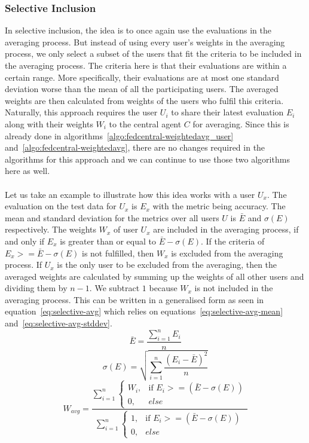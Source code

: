 \documentclass[12pt]{article}
\begin{document}
\subsubsection{Selective Inclusion}
In selective inclusion, the idea is to once again use the evaluations in the averaging process. But instead of using every user's weights in the averaging process, we only select a subset of the users that fit the criteria to be included in the averaging process. The criteria here is that their evaluations are within a certain range. More specifically, their evaluations are at most one standard deviation worse than the mean of all the participating users. The averaged weights are then calculated from weights of the users who fulfil this criteria. Naturally, this approach requires the user $U_i$ to share their latest evaluation $E_i$ along with their weights $W_i$ to the central agent $C$ for averaging. Since this is already done in algorithms~\ref{algo:fedcentral-weightedavg_user} and~\ref{algo:fedcentral-weightedavg}, there are no changes required in the algorithms for this approach and we can continue to use those two algorithms here as well.
\\\\
Let us take an example to illustrate how this idea works with a user $U_x$. The evaluation on the test data for $U_x$ is $E_x$ with the metric being accuracy. The mean and standard deviation for the metrics over all users $U$ is $\bar{E}$ and $\sigma(E)$ respectively. The weights $W_x$ of user $U_x$ are included in the averaging process, if and only if $E_x$ is greater than or equal to $\bar{E}-\sigma(E)$. If the criteria of $E_x >= \bar{E}-\sigma(E)$ is not fulfilled, then $W_x$ is excluded from the averaging process. If $U_x$ is the only user to be excluded from the averaging, then the averaged weights are calculated by summing up the weights of all other users and dividing them by $n-1$. We subtract $1$ because $W_x$ is not included in the averaging process. This can be written in a generalised form as seen in equation~\ref{eq:selective-avg} which relies on equations~\ref{eq:selective-avg-mean} and~\ref{eq:selective-avg-stddev}.
\begin{equation}\label{eq:selective-avg-mean}
	\bar{E} = \frac{\sum_{i=1}^{n}{E_i}}{n}
\end{equation}
\begin{equation}\label{eq:selective-avg-stddev}
	\sigma(E) = \sqrt{\sum_{i=1}^{n}{\frac{\left( {E_i - \bar{E}} \right)^{2}}{n}}}
\end{equation}
\begin{equation}\label{eq:selective-avg}
	W_{avg} = \frac{\sum_{i=1}^{n} \begin{cases}
		W_i, & \text{if }E_i>=\left(\bar{E}-\sigma(E)\right)\\
		0,   & else
	\end{cases}}
	{\sum_{i=1}^{n} \begin{cases}
		1, & \text{if }E_i>=\left(\bar{E}-\sigma(E)\right)\\
		0,   & else
	\end{cases}}
\end{equation}
\end{document}
